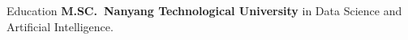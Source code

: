 \begin{rubric}{Education}
\entry*[2022 -- now]%
	\textbf{M.SC.~Nanyang Technological University} in Data Science and Artificial Intelligence.
%
\end{rubric}